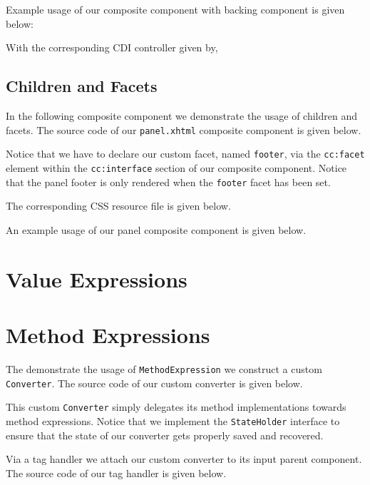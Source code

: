 Example usage of our composite component with backing component is given below:

With the corresponding CDI controller given by,


\subsection{Children and Facets}
In the following composite component we demonstrate the usage of children and facets.
The source code of our \texttt{panel.xhtml} composite component is given below.

Notice that we have to declare our custom facet, named \texttt{footer},
via the \texttt{cc:facet} element within the \texttt{cc:interface} section of our composite component.
Notice that the panel footer is only rendered when the \texttt{footer} facet has been set.

The corresponding CSS resource file is given below.


An example usage of our panel composite component is given below.


\section{Value Expressions}

\section{Method Expressions}
The demonstrate the usage of \texttt{MethodExpression} we construct a custom \texttt{Converter}.
The source code of our custom converter is given below.

This custom \texttt{Converter} simply delegates its method implementations towards method expressions.
Notice that we implement the \texttt{StateHolder} interface to ensure that the state of our converter gets properly saved and recovered.

Via a tag handler we attach our custom converter to its input parent component.
The source code of our tag handler is given below.


